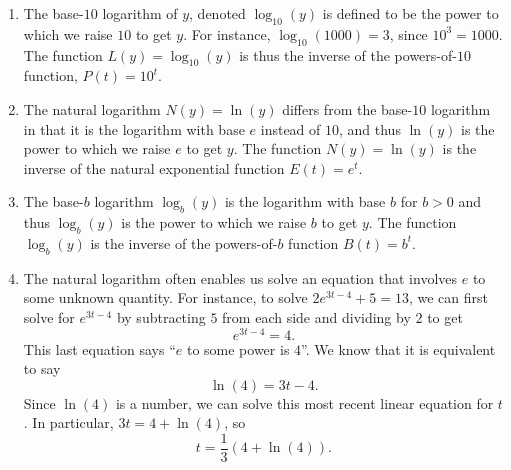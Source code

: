 \documentclass[nooutcomes]{ximera}
\begin{document}
\begin{summary}
\begin{enumerate}
\item
The base-\(10\) logarithm of \(y\), denoted \(\log_{10}(y)\) is defined to be the power to which we raise \(10\)  to get \(y\).  For instance, \(\log_{10}(1000) = 3\), since \(10^3 = 1000\).  The function \(L(y) = \log_{10}(y)\) is thus the inverse of the powers-of-\(10\) function, \(P(t) = 10^t\).%
\item
The natural logarithm \(N(y) = \ln(y)\)  differs from the base-\(10\) logarithm in that it is the logarithm with base \(e\) instead of \(10\), and thus \(\ln(y)\) is the power to which we raise \(e\) to get \(y\).  The function \(N(y) = \ln(y)\) is the inverse of the natural exponential function \(E(t) = e^t\).%
\item
The base-$b$ logarithm \(\log_b(y)\)  is the logarithm with base $b$ for $b > 0$ and thus \(\log_b(y)\) is the power to which we raise \(b\) to get \(y\).  The function \(\log_b(y)\) is the inverse of the powers-of-$b$ function \(B(t) = b^t\).%
\item
The natural logarithm often enables us solve an equation that involves \(e\) to some unknown quantity.  For instance, to solve \(2e^{3t-4} + 5 = 13\), we can first solve for \(e^{3t-4}\) by subtracting \(5\) from each side and dividing by \(2\) to get%
\begin{equation*}
e^{3t-4} = 4\text{.}
\end{equation*}
This last equation says ``\(e\) to some power is \(4\)''.  We know that it is equivalent to say%
\begin{equation*}
\ln(4) = 3t-4\text{.}
\end{equation*}
Since \(\ln(4)\) is a number, we can solve this most recent linear equation for \(t\).  In particular, \(3t = 4 + \ln(4)\), so%
\begin{equation*}
t = \frac{1}{3}(4 + \ln(4))\text{.}
\end{equation*}
%
\end{enumerate}
\end{summary}
\end{document}
